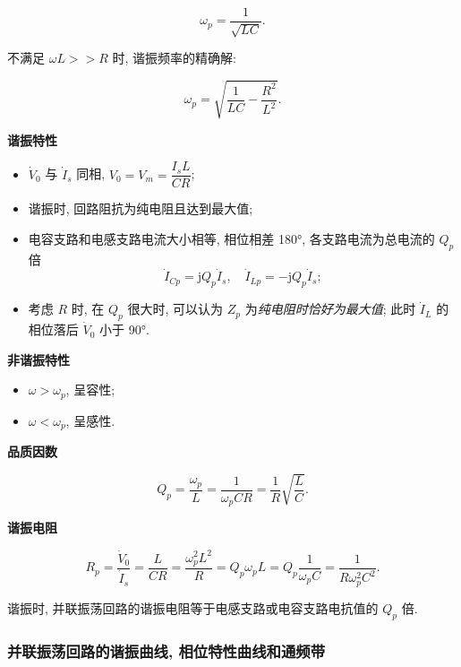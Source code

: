 \begin{equation}
    \omega_p=\frac{1}{\sqrt{LC}}.
\end{equation}

不满足 $\omega L>>R$ 时, 谐振频率的精确解:

\begin{equation}
    \omega_p=\sqrt{\frac{1}{LC}-\frac{R^2}{L^2}}.
\end{equation}

\textbf{谐振特性}

\begin{itemize}
    \item $\dot{V}_0$ 与 $\dot{I}_s$ 同相, $V_0=V_m=\dfrac{I_sL}{CR}$;
    \item 谐振时, 回路阻抗为纯电阻且达到最大值;
    \item 电容支路和电感支路电流大小相等, 相位相差 180°, 各支路电流为总电流的 $Q_p$ 倍
          \begin{equation}
              \dot{I}_{Cp}=\mathrm{j}Q_p\dot{I}_s,\quad\dot{I}_{Lp}=-\mathrm{j}Q_p\dot{I}_s;
          \end{equation}
    \item 考虑 $R$ 时, 在 $Q_p$ 很大时, 可以认为 $Z_p$ 为\textit{纯电阻时恰好为最大值}; 此时 $\dot{I}_L$ 的相位落后 $\dot{V}_0$ 小于 90°.
\end{itemize}

\textbf{非谐振特性}

\begin{itemize}
    \item $\omega>\omega_p$, 呈容性;
    \item $\omega<\omega_p$, 呈感性.
\end{itemize}

\textbf{品质因数}

\begin{equation}
    Q_p=\frac{\omega_p}{L}=\frac{1}{\omega_pCR}=\frac{1}{R}\sqrt{\frac{L}{C}}.
\end{equation}

\textbf{谐振电阻}

\begin{equation}
    R_p=\frac{\dot{V}_0}{\dot{I}_s}=\frac{L}{CR}=\frac{\omega_p^2L^2}{R}=Q_p\omega_pL=Q_p\frac{1}{\omega_pC}=\frac{1}{R\omega_p^2C^2}.
\end{equation}

谐振时, 并联振荡回路的谐振电阻等于电感支路或电容支路电抗值的 $Q_p$ 倍.

\subsubsection{并联振荡回路的谐振曲线, 相位特性曲线和通频带}

